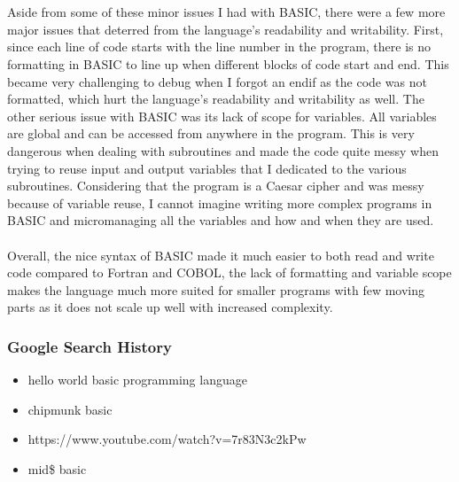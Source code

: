 \documentclass[letterpaper, 10pt, DIV=13]{scrartcl}
\numberwithin{equation}{section}
\numberwithin{figure}{section}
\numberwithin{table}{section}
\begin{document}
\\ \\
Aside from some of these minor issues I had with BASIC, there were a few more major issues that deterred from the language's readability and writability. First, since each line of code starts with the line number in the program, there is no formatting in BASIC to line up when different blocks of code start and end. This became very challenging to debug when I forgot an endif as the code was not formatted, which hurt the language's readability and writability as well. The other serious issue with BASIC was its lack of scope for variables. All variables are global and can be accessed from anywhere in the program. This is very dangerous when dealing with subroutines and made the code quite messy when trying to reuse input and output variables that I dedicated to the various subroutines. Considering that the program is a Caesar cipher and was messy because of variable reuse, I cannot imagine writing more complex programs in BASIC and micromanaging all the variables and how and when they are used.
\\ \\
Overall, the nice syntax of BASIC made it much easier to both read and write code compared to Fortran and COBOL, the lack of formatting and variable scope makes the language much more suited for smaller programs with few moving parts as it does not scale up well with increased complexity.

\subsubsection{Google Search History}
\begin{itemize}
	\item hello world basic programming language
	\item chipmunk basic
	\item https://www.youtube.com/watch?v=7r83N3c2kPw
	\item mid\$ basic 
\end{itemize}
\end{document}
